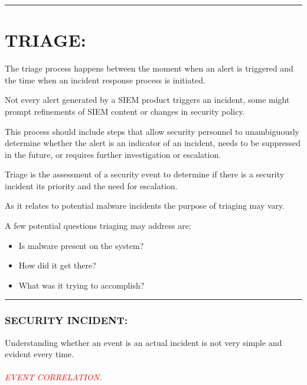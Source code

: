 \documentclass[10pt,british,english]{article}
\begin{document}
\rule[0.5ex]{1\columnwidth}{1pt}

\part{TRIAGE:}

The triage process happens between the moment when an alert is triggered
and the time when an incident response process is initiated. 

Not every alert generated by a SIEM product triggers an incident,
some might prompt refinements of SIEM content or changes in security
policy. 

This process should include steps that allow security personnel to
unambiguously determine whether the alert is an indicator of an incident,
needs to be suppressed in the future, or requires further investigation
or escalation.

Triage is the assessment of a security event to determine if there
is a security incident its priority and the need for escalation.

As it relates to potential malware incidents the purpose of triaging
may vary. 

A few potential questions triaging may address are:
\begin{itemize}
\item Is malware present on the system?
\item How did it get there?
\item What was it trying to accomplish?
\end{itemize}
\rule[0.5ex]{1\columnwidth}{1pt}

\section{SECURITY INCIDENT:}

Understanding whether an event is an actual incident is not very simple
and evident every time. 

\paragraph{\textcolor{red}{EVENT CORRELATION. }}
\end{document}
